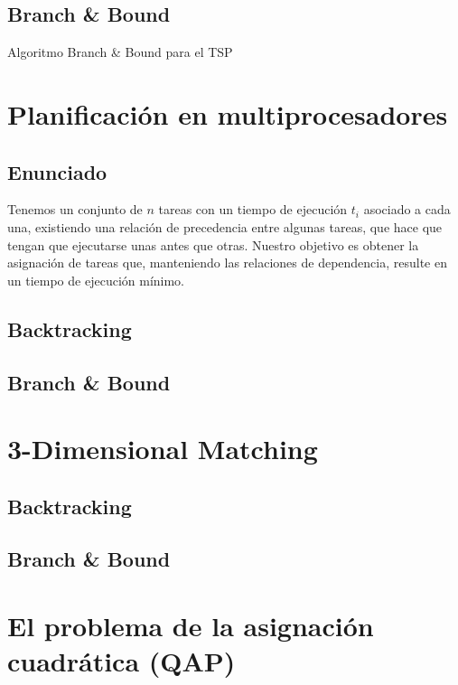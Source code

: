 \documentclass[a4paper, 11pt]{article} %
\begin{document}
  \subsection{Branch \& Bound}
    \begin{algorithm}[H]
        	\begin{algorithmic}[1]
    			\STATE{}
        	\end{algorithmic}
        \caption{Algoritmo Branch \& Bound para el TSP}
        \label{BBound-TSP}
    \end{algorithm}

\section{Planificación en multiprocesadores}
  \subsection{Enunciado}
  Tenemos un conjunto de $n$ tareas con un tiempo de ejecución $t_i$ asociado a cada una, existiendo una relación de precedencia
  entre algunas tareas, que hace que tengan que ejecutarse unas antes que otras. Nuestro objetivo es obtener la asignación de tareas que, manteniendo las relaciones de dependencia, resulte en un tiempo de ejecución mínimo. 
  
  
  \subsection{Backtracking}
  \subsection{Branch \& Bound}

\section{3-Dimensional Matching}
  \subsection{Backtracking}
  \subsection{Branch \& Bound}

\section{El problema de la asignación cuadrática (QAP)}
\end{document}
